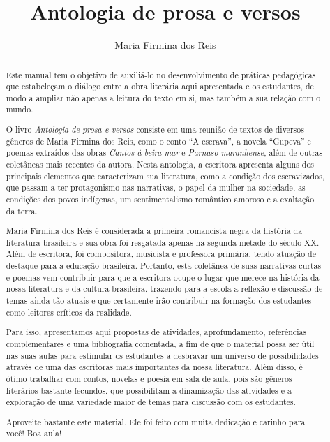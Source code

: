 \documentclass[12pt]{extarticle}
\begin{document}
\newcommand{\AutorLivro}{Maria Firmina dos Reis}
\newcommand{\TituloLivro}{Antologia de prosa e versos}
\newcommand{\Tema}{Ficção, mistério e fantasia}
\newcommand{\Genero}{Conto; crônica, novela e poema}
\newcommand{\imagemCapa}{./images/PNLD0014-01.png}
\newcommand{\issnppub}{---}
\newcommand{\issnepub}{---}
\newcommand{\colaborador}{\textbf{Rodrigo Jorge Ribeiro Neves} é uma pessoa incrível e vai fazer um bom serviço.}


\title{\TituloLivro}
\author{\AutorLivro}
\def\authornotes{\colaborador}

\date{}
\maketitle


\begin{abstract}

Este manual tem o objetivo de auxiliá-lo no desenvolvimento de práticas
pedagógicas que estabeleçam o diálogo entre a obra literária aqui
apresentada e os estudantes, de modo a ampliar não apenas a leitura do
texto em si, mas também a sua relação com o mundo.

O livro \emph{Antologia de prosa e versos} consiste em uma reunião de
textos de diversos gêneros de Maria Firmina dos Reis, como o conto ``A
escrava'', a novela ``Gupeva'' e poemas extraídos das obras \emph{Cantos
à beira-mar} e \emph{Parnaso maranhense}, além de outras coletâneas mais
recentes da autora. Nesta antologia, a escritora apresenta alguns dos
principais elementos que caracterizam sua literatura, como a condição
dos escravizados, que passam a ter protagonismo nas narrativas, o papel
da mulher na sociedade, as condições dos povos indígenas, um
sentimentalismo romântico amoroso e a exaltação da terra.

Maria Firmina dos Reis é considerada a primeira romancista negra da
história da literatura brasileira e sua obra foi resgatada apenas na
segunda metade do século XX. Além de escritora, foi compositora,
musicista e professora primária, tendo atuação de destaque para a
educação brasileira. Portanto, esta coletânea de suas narrativas curtas
e poemas vem contribuir para que a escritora ocupe o lugar que merece na
história da nossa literatura e da cultura brasileira, trazendo para a
escola a reflexão e discussão de temas ainda tão atuais e que certamente
irão contribuir na formação dos estudantes como leitores críticos da
realidade.

Para isso, apresentamos aqui propostas de atividades, aprofundamento,
referências complementares e uma bibliografia comentada, a fim de que o
material possa ser útil nas suas aulas para estimular os estudantes a
desbravar um universo de possibilidades através de uma das escritoras
mais importantes da nossa literatura. Além disso, é ótimo trabalhar com
contos, novelas e poesia em sala de aula, pois são gêneros literários
bastante fecundos, que possibilitam a dinamização das atividades e a
exploração de uma variedade maior de temas para discussão com os
estudantes.

Aproveite bastante este material. Ele foi feito com muita dedicação e
carinho para você! Boa aula!
\end{abstract}
\end{document}
